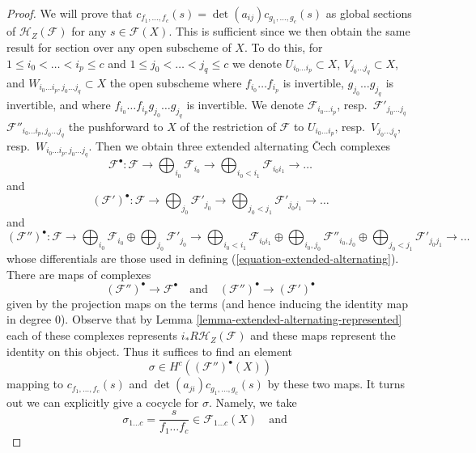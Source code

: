 \documentclass{stacks-project}
\theoremstyle{plain}
\theoremstyle{definition}
\theoremstyle{remark}
\numberwithin{equation}{subsection}
\begin{document}
\begin{proof}
We will prove that $c_{f_1, \ldots, f_c}(s) =
\det(a_{ij}) c_{g_1, \ldots, g_c}(s)$ as global sections of
$\mathcal{H}_Z(\mathcal{F})$ for any $s \in \mathcal{F}(X)$.
This is sufficient since we then obtain the same result for
section over any open subscheme of $X$.
To do this, for $1 \leq i_0 < \ldots < i_p \leq c$
and $1 \leq j_0 < \ldots < j_q \leq c$ we denote
$U_{i_0 \ldots i_p} \subset X$,
$V_{j_0 \ldots j_q} \subset X$, and
$W_{i_0 \ldots i_p, j_0 \ldots j_q} \subset X$
the open subscheme where $f_{i_0} \ldots f_{i_p}$ is invertible,
$g_{j_0} \ldots g_{j_q}$ is invertible, and where
$f_{i_0} \ldots f_{i_p}g_{j_0} \ldots g_{j_q}$ is invertible.
We denote $\mathcal{F}_{i_0 \ldots i_p}$,
resp.\ $\mathcal{F}'_{j_0 \ldots j_q}$
$\mathcal{F}''_{i_0 \ldots i_p, j_0 \ldots j_q}$
the pushforward to $X$ of the restriction of $\mathcal{F}$ to
$U_{i_0 \ldots i_p}$, resp.\ $V_{j_0 \ldots j_q}$,
resp.\ $W_{i_0 \ldots i_p, j_0 \ldots j_q}$.
Then we obtain three extended alternating {\v C}ech complexes
$$
\mathcal{F}^\bullet :
\mathcal{F} \to \bigoplus\nolimits_{i_0} \mathcal{F}_{i_0} \to
\bigoplus\nolimits_{i_0 < i_1} \mathcal{F}_{i_0i_1} \to \ldots
$$
and
$$
(\mathcal{F}')^\bullet :
\mathcal{F} \to \bigoplus\nolimits_{j_0} \mathcal{F}'_{j_0} \to
\bigoplus\nolimits_{j_0 < j_1} \mathcal{F}'_{j_0j_1} \to \ldots
$$
and
$$
(\mathcal{F}'')^\bullet :
\mathcal{F} \to
\bigoplus\nolimits_{i_0} \mathcal{F}_{i_0} \oplus
\bigoplus\nolimits_{j_0} \mathcal{F}'_{j_0} \to
\bigoplus\nolimits_{i_0 < i_1} \mathcal{F}_{i_0i_1} \oplus
\bigoplus\nolimits_{i_0, j_0} \mathcal{F}''_{i_0, j_0} \oplus
\bigoplus\nolimits_{j_0 < j_1} \mathcal{F}'_{j_0j_1} \to
\ldots
$$
whose differentials are those used in defining
(\ref{equation-extended-alternating}).
There are maps of complexes
$$
(\mathcal{F}'')^\bullet \to \mathcal{F}^\bullet
\quad\text{and}\quad
(\mathcal{F}'')^\bullet \to (\mathcal{F}')^\bullet
$$
given by the projection maps on the terms (and hence inducing
the identity map in degree $0$). Observe that by
Lemma \ref{lemma-extended-alternating-represented}
each of these complexes represents
$i_*R\mathcal{H}_Z(\mathcal{F})$ and these maps
represent the identity on this object. Thus it suffices
to find an element
$$
\sigma \in H^c((\mathcal{F}'')^\bullet(X))
$$
mapping to $c_{f_1, \ldots, f_c}(s)$ and $\det(a_{ji})c_{g_1, \ldots, g_c}(s)$
by these two maps. It turns out we can explicitly give a cocycle
for $\sigma$. Namely, we take
$$
\sigma_{1 \ldots c} = \frac{s}{f_1 \ldots f_c} \in \mathcal{F}_{1 \ldots c}(X)
\quad\text{and}\quad
$$
\end{proof}
\end{document}
